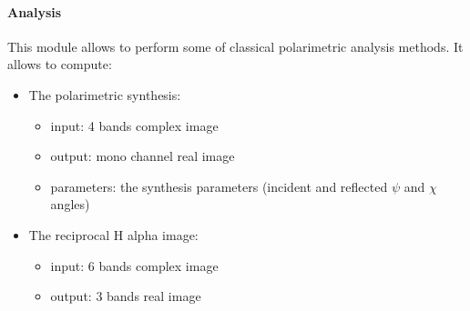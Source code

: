 \paragraph{Analysis}

This module allows to perform some of classical polarimetric analysis methods. It allows to compute:
\begin{itemize}
\item The polarimetric synthesis:
\begin{itemize}
\item input: 4 bands complex image
\item output: mono channel real image 
\item parameters: the synthesis parameters (incident and reflected $\psi$ and $\chi$ angles)
\end{itemize}
\item The reciprocal H alpha image:
\begin{itemize}
\item input: 6 bands complex image
\item output: 3 bands real image 
\end{itemize}
\end{itemize}

